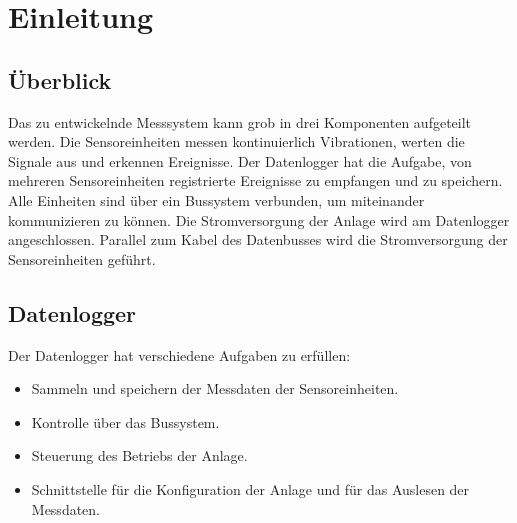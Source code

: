 %
%

\chapter{Einleitung}\label{chap.einleitung}



\section{Überblick}\label{sec.ueberblick}
Das zu entwickelnde Messsystem kann grob in drei Komponenten aufgeteilt werden. Die Sensoreinheiten messen kontinuierlich Vibrationen, werten die Signale aus und erkennen Ereignisse. Der Datenlogger hat die Aufgabe, von mehreren Sensoreinheiten registrierte Ereignisse zu empfangen und zu speichern. Alle Einheiten sind über ein Bussystem verbunden, um miteinander kommunizieren zu können. Die Stromversorgung der Anlage wird am Datenlogger angeschlossen. Parallel zum Kabel des Datenbusses wird die Stromversorgung der Sensoreinheiten geführt.


\section{Datenlogger}
Der Datenlogger hat verschiedene Aufgaben zu erfüllen:
\begin{itemize}
\item Sammeln und speichern der Messdaten der Sensoreinheiten.
\item Kontrolle über das Bussystem.
\item Steuerung des Betriebs der Anlage.
\item Schnittstelle für die Konfiguration der Anlage und für das Auslesen der Messdaten.
\end{itemize}


